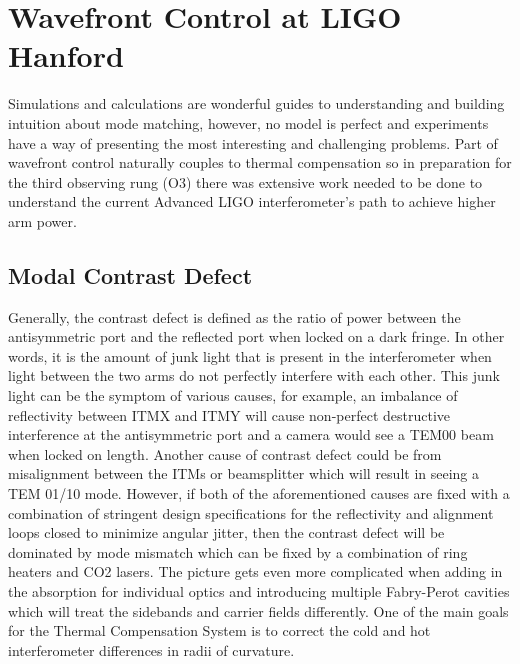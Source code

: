 \chapter{Wavefront Control at LIGO Hanford}\label{chapter:MM_LHO}
	Simulations and calculations are wonderful guides to understanding and building intuition about mode matching, however, no model is perfect and experiments have a way of presenting the most interesting and challenging problems. Part of wavefront control naturally couples to thermal compensation so in preparation for the third observing rung (O3) there was extensive work needed to be done to understand the current Advanced LIGO interferometer's path to achieve higher arm power.

	\section{Modal Contrast Defect}
	Generally, the contrast defect is defined as the ratio of power between the antisymmetric port and the reflected port when locked on a dark fringe.  In other words, it is the amount of junk light that is present in the interferometer when light between the two arms do not perfectly interfere with each other. This junk light can be the symptom of various causes, for example, an imbalance of reflectivity between ITMX and ITMY will cause non-perfect destructive interference at the antisymmetric port and a camera would see a TEM00 beam when locked on length.  Another cause of contrast defect could be from misalignment between the ITMs or beamsplitter which will result in seeing a TEM 01/10 mode.  However, if both of the aforementioned causes are fixed with a combination of stringent design specifications for the reflectivity and alignment loops closed to minimize angular jitter, then the contrast defect will be dominated by mode mismatch which can be fixed by a combination of ring heaters and CO2 lasers.  The picture gets even more complicated when adding in the absorption for individual optics and introducing multiple Fabry-Perot cavities which will treat the sidebands and carrier fields differently.  One of the main goals for the Thermal Compensation System is to correct the cold and hot interferometer differences in radii of curvature.
	
